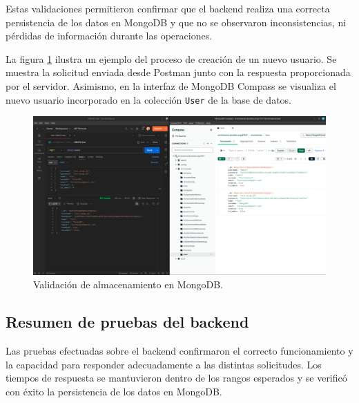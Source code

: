 Estas validaciones permitieron confirmar que el backend realiza una correcta
persistencia de los datos en MongoDB y que no se observaron inconsistencias, ni
pérdidas de información durante las operaciones.

La figura \ref{fig:mongodb} ilustra un ejemplo del proceso de creación de un
nuevo usuario. Se muestra la solicitud enviada desde Postman junto con la
respuesta proporcionada por el servidor. Asimismo, en la interfaz de MongoDB
Compass se visualiza el nuevo usuario incorporado en la colección \texttt{User}
de la base de datos.

\begin{figure}[H]
    \centering
    \includegraphics[width=\textwidth]{Images/39_test_mongodb.png}
    \caption[Validación de almacenamiento en MongoDB]{Validación de almacenamiento en MongoDB.}
    \label{fig:mongodb}
\end{figure}

\subsection{Resumen de pruebas del backend}

Las pruebas efectuadas sobre el backend confirmaron el correcto funcionamiento
y la capacidad para responder adecuadamente a las distintas solicitudes. Los
tiempos de respuesta se mantuvieron dentro de los rangos esperados y se
verificó con éxito la persistencia de los datos en MongoDB.

